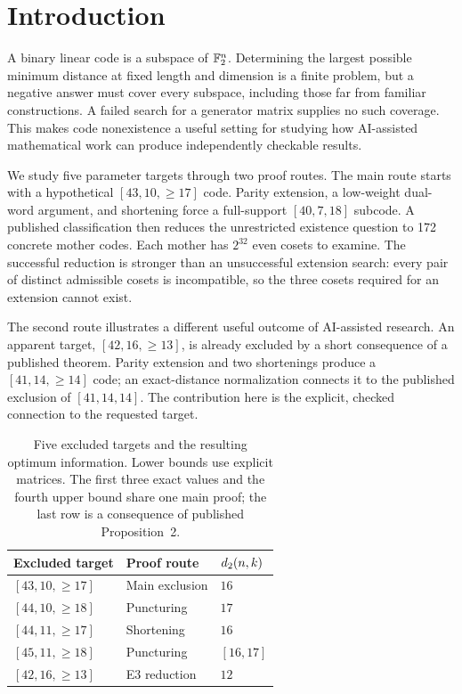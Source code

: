 \section{Introduction}
A binary linear code is a subspace of $\mathbb F_2^n$. Determining the largest possible minimum distance at fixed length and dimension is a finite problem, but a negative answer must cover every subspace, including those far from familiar constructions. A failed search for a generator matrix supplies no such coverage. This makes code nonexistence a useful setting for studying how AI-assisted mathematical work can produce independently checkable results.

We study five parameter targets through two proof routes. The main route starts with a hypothetical $[43,10,\ge17]$ code. Parity extension, a low-weight dual-word argument, and shortening force a full-support $[40,7,18]$ subcode. A published classification then reduces the unrestricted existence question to 172 concrete mother codes. Each mother has $2^{32}$ even cosets to examine. The successful reduction is stronger than an unsuccessful extension search: every pair of distinct admissible cosets is incompatible, so the three cosets required for an extension cannot exist.

The second route illustrates a different useful outcome of AI-assisted research. An apparent target, $[42,16,\ge13]$, is already excluded by a short consequence of a published theorem. Parity extension and two shortenings produce a $[41,14,\ge14]$ code; an exact-distance normalization connects it to the published exclusion of $[41,14,14]$. The contribution here is the explicit, checked connection to the requested target.

\begin{table}[t]
\caption{Five excluded targets and the resulting optimum information. Lower bounds use explicit matrices. The first three exact values and the fourth upper bound share one main proof; the last row is a consequence of published Proposition~2.}
\label{tab:results}
\centering\small
\begin{tabular}{@{}lll@{}}
\toprule
Excluded target & Proof route &  $d_2(n,k)$\\
\midrule
$[43,10,\ge17]$ & Main exclusion & $16$\\
$[44,10,\ge18]$ & Puncturing & $17$\\
$[44,11,\ge17]$ & Shortening & $16$\\
$[45,11,\ge18]$ & Puncturing & $[16,17]$\\
$[42,16,\ge13]$ & E3 reduction & $12$\\
\bottomrule
\end{tabular}
\end{table}

